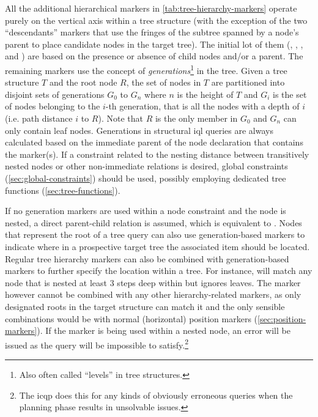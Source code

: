 \documentclass[11pt,a4paper]{article}
\begin{document}
All the additional hierarchical markers in \cref{tab:tree-hierarchy-markers} operate purely on the vertical axis within a tree structure (with the exception of the two ``descendants'' markers that use the fringes of the subtree spanned by a node's parent to place candidate nodes in the target tree).
The initial lot of them (, , ,  and ) are based on the presence or absence of child nodes and/or a parent.
The remaining markers use the concept of \textit{generations}\footnote{Also often called ``levels'' in tree structures.} in the tree.
Given a tree structure $T$ and the root node $R$, the set of nodes in $T$ are partitioned into disjoint sets of generations $G_0$ to $G_n$ where $n$ is the height of $T$ and $G_i$ is the set of nodes belonging to the $i$-th generation, that is all the nodes with a depth of $i$ (i.e. path distance $i$ to $R$). 
Note that $R$ is the only member in $G_0$ and $G_n$ can only contain leaf nodes.
Generations in structural \ac{iql} queries are always calculated based on the immediate parent of the node declaration that contains the marker(s).
If a constraint related to the nesting distance between transitively nested nodes or other non-immediate relations is desired, global constraints (\ref{sec:global-constraints}) should be used, possibly employing dedicated tree functions (\ref{sec:tree-functions}).

If no generation markers are used within a node constraint and the node is nested, a direct parent-child relation is assumed, which is equivalent to .
Nodes that represent the root of a tree query can also use generation-based markers to indicate where in a prospective target tree the associated item should be located.
Regular tree hierarchy markers can also be combined with generation-based markers to  further specify the location within a tree.
For instance,  will match any node that is nested at least 3 steps deep within  but ignores leaves.
The  marker however cannot be combined with any other hierarchy-related markers, as only designated roots in the target structure can match it and the only sensible combinations would be with normal (horizontal) position markers (\ref{sec:position-markers}).
If the  marker is being used within a nested node, an error will be issued as the query will be impossible to satisfy.\footnote{The \ac{icqp} does this for any kinds of obviously erroneous queries when the planning phase results in unsolvable issues.}
\end{document}
